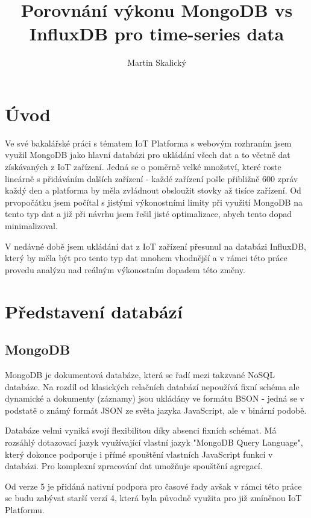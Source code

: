\documentclass{article}
\title{Porovnání výkonu MongoDB vs InfluxDB pro time-series data}
\author{Martin Skalický}
\begin{document}
\maketitle

\section{Úvod}

Ve své bakalářské práci s tématem IoT Platforma s webovým rozhraním jsem využil MongoDB jako hlavní databázi pro ukládání všech dat a to včetně dat získávaných z IoT zařízení. Jedná se o poměrně velké množství, které roste lineárně s přidáváním dalších zařízení - každé zařízení pošle přibližně 600 zpráv každý den a platforma by měla zvládnout obsloužit stovky až tisíce zařízení. Od prvopočátku jsem počítal s jistými výkonostními limity při využití MongoDB na tento typ dat a již při návrhu jsem řešil jisté optimalizace, abych tento dopad minimalizoval.

V nedávné době jsem ukládání dat z IoT zařízení přesunul na databázi InfluxDB, který by měla být pro tento typ dat mnohem vhodnější a v rámci této práce provedu analýzu nad reálným výkonostním dopadem této změny.

\section{Představení databází}

\subsection{MongoDB}

MongoDB je dokumentová databáze, která se řadí mezi takzvané NoSQL databáze. Na rozdíl od klasických relačních databází nepoužívá fixní schéma ale dynamické a dokumenty (záznamy) jsou ukládány ve formátu BSON - jedná se v podstatě o známý formát JSON ze světa jazyka JavaScript, ale v binární podobě.

Databáze velmi vyniká svojí flexibilitou díky absenci fixních schémat. Má rozsáhlý dotazovací jazyk využívající vlastní jazyk "MongoDB Query Language", který dokonce podporuje i přímé spouštění vlastních JavaScript funkcí v databázi. Pro komplexní zpracování dat umožňuje spouštění agregací. 

Od verze 5 je přidáná nativní podpora pro časové řady avšak v rámci této práce se budu zabývat starší verzí 4, která byla původně využita pro již zmíněnou IoT Platformu.
\end{document}
